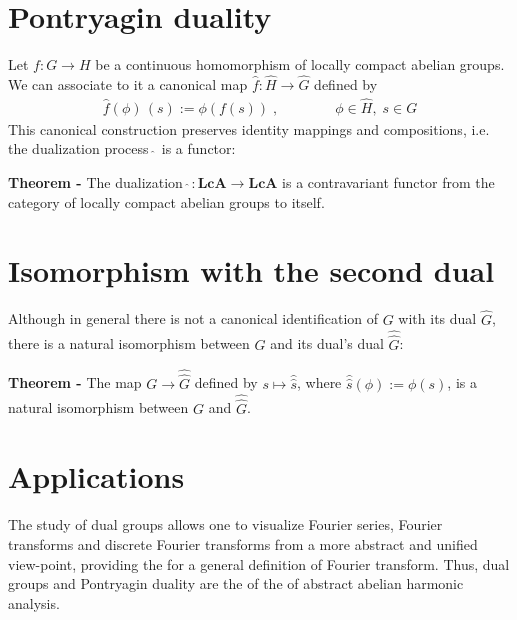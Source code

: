 \documentclass[12pt]{article}
\begin{document}
\section{Pontryagin duality}

Let $f:G \longrightarrow H$ be a continuous homomorphism of locally compact abelian groups. We can associate to it a canonical map $\hat{f}:\hat{H} \longrightarrow \hat{G}$ defined by
\begin{align*}
\hat{f}(\phi)\,(s):= \phi(f(s))\;, \qquad\qquad \phi \in \hat{H},\; s \in G
\end{align*}
This canonical construction preserves identity mappings and compositions, i.e. the dualization process $\hat{\;}$ is a functor:

{\bf Theorem -} The dualization $\hat{\;}:\mathord{\mathbf{LcA}} \longrightarrow \mathord{\mathbf{LcA}} $ is a contravariant functor from the category of locally compact abelian groups to itself.

\section{Isomorphism with the second dual}

Although in general there is not a canonical identification of $G$ with its dual $\hat{G}$, there is a natural isomorphism between $G$ and its dual's dual $\hat{\hat{G}}$:

{\bf Theorem -} The map $G \longrightarrow \hat{\hat{G}}$ defined by $s \mapsto \hat{\hat{s}}$, where $\hat{\hat{s}}(\phi) := \phi(s)$, is a natural isomorphism between $G$ and $\hat{\hat{G}}$.

\section{Applications}

The study of dual groups allows one to visualize Fourier series, Fourier transforms and discrete Fourier transforms from a more abstract and unified view-point, providing the  for a general definition of Fourier transform. Thus, dual groups and Pontryagin duality are the  of the  of abstract abelian harmonic analysis.
\end{document}
